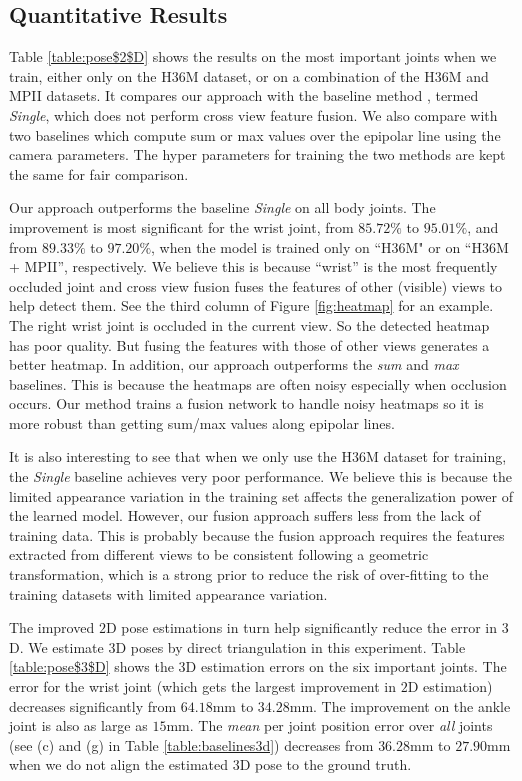 \documentclass[10pt,twocolumn,letterpaper]{article}
\begin{document}
\subsection{Quantitative Results}
Table \ref{table:pose$2$D} shows the results on the most important joints when we train, either only on the H36M dataset, or on a combination of the H36M and MPII datasets. It compares our approach with the baseline method \cite{simplebaselines}, termed \textit{Single}, which does not perform cross view feature fusion. We also compare with two baselines which compute sum or max values over the epipolar line using the camera parameters. The hyper parameters for training the two methods are kept the same for fair comparison.

Our approach outperforms the baseline \textit{Single} on all body joints. The improvement is most significant for the wrist joint, from $85.72\%$ to $95.01\%$, and from $89.33\%$ to $97.20\%$, when the model is trained only on ``H36M" or on ``H36M + MPII'', respectively. We believe this is because ``wrist'' is the most frequently occluded joint and cross view fusion fuses the features of other (visible) views to help detect them. See the third column of Figure \ref{fig:heatmap} for an example. The right wrist joint is occluded in the current view. So the detected heatmap has poor quality. But fusing the features with those of other views generates a better heatmap. In addition, our approach outperforms the \textit{sum} and \textit{max} baselines. This is because the heatmaps are often noisy especially when occlusion occurs. Our method trains a fusion network to handle noisy heatmaps so it is more robust than getting sum/max values along epipolar lines.



It is also interesting to see that when we only use the H36M dataset for training, the \textit{Single} baseline achieves very poor performance. We believe this is because the limited appearance variation in the training set affects the generalization power of the learned model. However, our fusion approach suffers less from the lack of training data. This is probably because the fusion approach requires the features extracted from different views to be consistent following a geometric transformation, which is a strong prior to reduce the risk of over-fitting to the training datasets with limited appearance variation. 

The improved $2$D pose estimations in turn help significantly reduce the error in $3$D. We estimate $3$D poses by direct triangulation in this experiment. Table \ref{table:pose$3$D} shows the $3$D estimation errors on the six important joints.  The error for the wrist joint (which gets the largest improvement in $2$D estimation) decreases significantly from $64.18$mm to $34.28$mm. The improvement on the ankle joint is also as large as $15$mm. The \textit{mean} per joint position error over \textit{all} joints (see (c) and (g) in Table \ref{table:baselines3d}) decreases from $36.28$mm to $27.90$mm when we do not align the estimated $3$D pose to the ground truth. 
\end{document}
